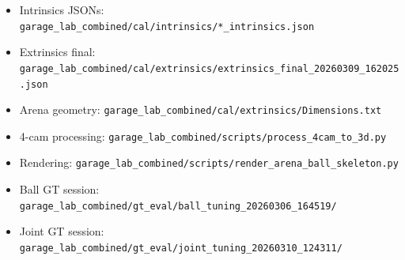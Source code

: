 \begin{itemize}
  \item Intrinsics JSONs: \texttt{garage\_lab\_combined/cal/intrinsics/*\_intrinsics.json}
  \item Extrinsics final: \texttt{garage\_lab\_combined/cal/extrinsics/extrinsics\_final\_20260309\_162025.json}
  \item Arena geometry: \texttt{garage\_lab\_combined/cal/extrinsics/Dimensions.txt}
  \item 4-cam processing: \texttt{garage\_lab\_combined/scripts/process\_4cam\_to\_3d.py}
  \item Rendering: \texttt{garage\_lab\_combined/scripts/render\_arena\_ball\_skeleton.py}
  \item Ball GT session: \texttt{garage\_lab\_combined/gt\_eval/ball\_tuning\_20260306\_164519/}
  \item Joint GT session: \texttt{garage\_lab\_combined/gt\_eval/joint\_tuning\_20260310\_124311/}
\end{itemize}
